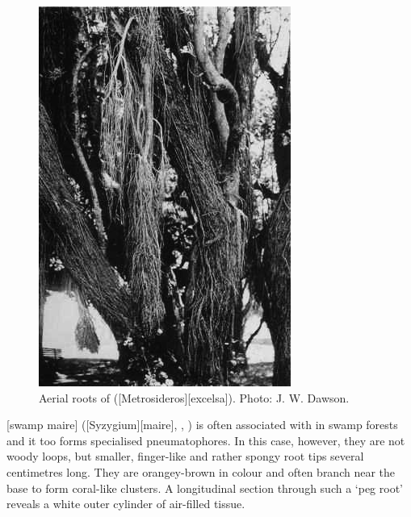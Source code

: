 \begin{figure}[t]
\begin{minipage}[t]{\textwidth}
		\begin{minipage}[t]{(\textwidth-\fgap-\fgap) * \real{0.354}}
			\centering
			\includegraphics[width=\textwidth]{graphics/figure15pohutakawa.jpg}
			\caption[Aerial roots of pohutukawa]{Aerial roots of  ([Metrosideros][excelsa]).
			Photo:  J. W. Dawson.}%
			\label{fig:15pohutakawa}
		\end{minipage}
	\end{minipage}
\end{figure}

[swamp maire] ([Syzygium][maire], , ) is often associated with  in swamp forests and it too forms specialised pneumatophores.
In this case, however, they are not woody loops, but smaller, finger-like and rather spongy root tips several centimetres long.
They are orangey-brown in colour and often branch near the base to form coral-like clusters.
A longitudinal section through such a `peg root' reveals a white outer cylinder of air-filled tissue.


